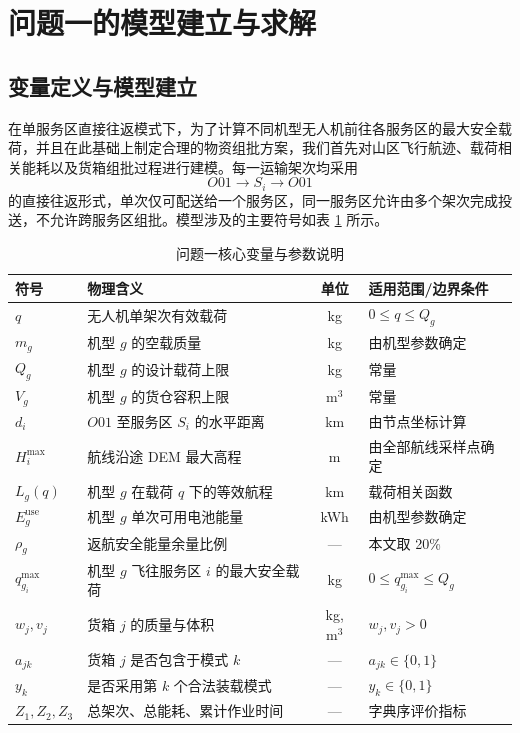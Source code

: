 \section{问题一的模型建立与求解}

\subsection{变量定义与模型建立}

在单服务区直接往返模式下，为了计算不同机型无人机前往各服务区的最大安全载荷，并且在此基础上制定合理的物资组批方案，我们首先对山区飞行航迹、载荷相关能耗以及货箱组批过程进行建模。每一运输架次均采用
$$
O01 \rightarrow S_i \rightarrow O01
$$
的直接往返形式，单次仅可配送给一个服务区，同一服务区允许由多个架次完成投送，不允许跨服务区组批。模型涉及的主要符号如表 \ref{1fuhaoshuoming} 所示。

\begin{table}[htbp]
	\centering
	\caption{问题一核心变量与参数说明}\label{1fuhaoshuoming}
	\renewcommand{\arraystretch}{1.4}
	\begin{tabular}{llcl}
		\toprule
		\textbf{符号} & \textbf{物理含义} & \textbf{单位} & \textbf{适用范围/边界条件} \\
		\midrule
		$q$ & 无人机单架次有效载荷 & kg & $0 \leq q \leq Q_g$ \\
		$m_g$ & 机型 $g$ 的空载质量 & kg & 由机型参数确定 \\
		$Q_g$ & 机型 $g$ 的设计载荷上限 & kg & 常量 \\
		$V_g$ & 机型 $g$ 的货仓容积上限 & $\text{m}^3$ & 常量 \\
		$d_i$ & $O01$ 至服务区 $S_i$ 的水平距离 & km & 由节点坐标计算 \\
		$H_i^{\text{max}}$ & 航线沿途 DEM 最大高程 & m & 由全部航线采样点确定 \\
		$L_g(q)$ & 机型 $g$ 在载荷 $q$ 下的等效航程 & km & 载荷相关函数 \\
		$E_g^{\text{use}}$ & 机型 $g$ 单次可用电池能量 & kWh & 由机型参数确定 \\
		$\rho_g$ & 返航安全能量余量比例 & --- & 本文取 20\% \\
		$q_{g_i}^{\text{max}}$ & 机型 $g$ 飞往服务区 $i$ 的最大安全载荷 & kg & $0 \leq q_{g_i}^{\text{max}} \leq Q_g$ \\
		$w_j, v_j$ & 货箱 $j$ 的质量与体积 & kg, $\text{m}^3$ & $w_j, v_j > 0$ \\
		$a_{jk}$ & 货箱 $j$ 是否包含于模式 $k$ & --- & $a_{jk} \in \{0, 1\}$ \\
		$y_k$ & 是否采用第 $k$ 个合法装载模式 & --- & $y_k \in \{0, 1\}$ \\
		$Z_1, Z_2, Z_3$ & 总架次、总能耗、累计作业时间 & --- & 字典序评价指标 \\
		\bottomrule
	\end{tabular}
\end{table}
